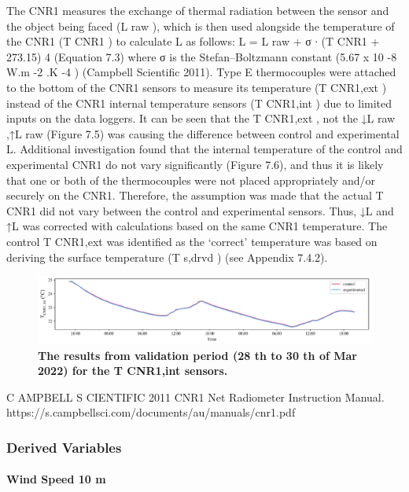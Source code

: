 \documentclass[final,3p,times,authoryear]{elsarticle}
\begin{document}
The CNR1 measures the exchange of thermal radiation between the sensor and the
object being faced (L raw ), which is then used alongside the temperature of the CNR1
(T CNR1 ) to calculate L as follows:
L = L raw + σ ∙ (T CNR1 + 273.15) 4
(Equation 7.3)
where σ is the Stefan–Boltzmann constant (5.67 x 10 -8 W.m -2 .K -4 ) (Campbell Scientific
2011).
Type E thermocouples were attached to the bottom of the CNR1 sensors to measure its
temperature (T CNR1,ext ) instead of the CNR1 internal temperature sensors (T CNR1,int ) due
to limited inputs on the data loggers. It can be seen that the T CNR1,ext , not the ↓L raw ,↑L raw
(Figure 7.5) was causing the difference between control and experimental L.
Additional investigation found that the internal temperature of the control and
experimental CNR1 do not vary significantly (Figure 7.6), and thus it is likely that one
or both of the thermocouples were not placed appropriately and/or securely on the
CNR1. Therefore, the assumption was made that the actual T CNR1 did not vary between
the control and experimental sensors. Thus, ↓L and ↑L was corrected with calculations
based on the same CNR1 temperature.
The control T CNR1,ext was identified as the ‘correct’ temperature was based on deriving
the surface temperature (T s,drvd ) (see Appendix 7.4.2).

\begin{figure}
\centering
\includegraphics[trim={0 0 0 0},clip,scale=1.0]{pict022.png}
\caption{\bf The results from validation period (28 th to 30 th of Mar 2022) for the T CNR1,int sensors.}
 \label{fig:7.6}
\end{figure}

C AMPBELL S CIENTIFIC 2011 CNR1 Net Radiometer Instruction Manual.
https://s.campbellsci.com/documents/au/manuals/cnr1.pdf


\subsubsection{Derived Variables}\label{sec:appendix7.4}
\paragraph{Wind Speed 10 m}\label{sec:appendix7.4.1}
\end{document}
